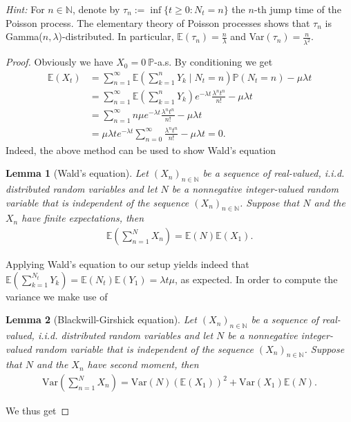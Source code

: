 \documentclass[12pt,a4paper, twoside]{article}
\newtheorem{lem}{Lemma}[section]
\theoremstyle{definition}
\newcommand{\EE}{\mathbb{E}} %
\newcommand{\PP}{\mathbb{P}} %
\begin{document}
\textit{Hint:} For $n \in \mathbb{N}$, denote by $\tau_n := \inf \{ t \geq 0 : N_t = n \}$ the $n$-th jump time of the Poisson process. The elementary theory of Poisson processes shows that $\tau_n$ is Gamma($n,  \lambda$)-distributed. In particular,  $\EE( \tau_n) = \frac{n}{\lambda}$ and Var$( \tau_n) = \frac{n}{\lambda^2}$. 
\begin{proof}
Obviously we have $X_0=0 \ \PP$-a.s. By conditioning we get
\begin{align*}
\EE (X_t)& = \sum_{n=1}^\infty \EE\left( \sum_{k=1}^n Y_k  \mid N_t = n \right) \PP(N_t=n)- \mu \lambda t \\
&= \sum_{n=1}^\infty \EE \left( \sum_{k=1}^n Y_k \right) e^{- \lambda t} \frac{\lambda^n t^n}{n!}- \mu \lambda t \tag{$N_t \sim P_o( \lambda) \perp Y_k$} \\
& =\sum_{n=1}^\infty n \mu e^{- \lambda t} \frac{\lambda^n t^n}{n!}- \mu \lambda t \\ & = \mu \lambda t e^{- \lambda t} \sum_{n=0}^\infty  \frac{\lambda^n t^n}{n!}- \mu  \lambda t =0.
\end{align*}
Indeed, the above method can be used to show Wald's equation
\begin{lem}[Wald's equation] Let $(X_n)_{n \in \mathbb{N}}$ be a sequence of real-valued, i.i.d. distributed random variables and let $N$ be a nonnegative integer-valued random variable that is independent of the sequence $(X_n)_{n \in \mathbb{N}}$. Suppose that $N$ and the $X_n$ have finite expectations, then
\begin{align*}
\EE \left( \sum_{n=1}^N X_n \right) = \EE(N)\EE(X_1).
\end{align*}
\end{lem}
Applying Wald's equation to our setup yields indeed that \\ $\EE( \sum_{k=1}^{N_t} Y_k) = \EE( N_t) \EE(Y_1) = \lambda t \mu$, as expected. 
\newpage
In order to compute the variance we make use of 
\begin{lem}[Blackwill-Girshick equation]Let $(X_n)_{n \in \mathbb{N}}$ be a sequence of real-valued, i.i.d. distributed random variables and let $N$ be a nonnegative integer-valued random variable that is independent of the sequence $(X_n)_{n \in \mathbb{N}}$. Suppose that $N$ and the $X_n$ have second moment, then
\begin{align*}
\text{Var} \left( \sum_{n=1}^N X_n\right) = \text{Var}(N)(\EE(X_1))^2+ \text{Var}(X_1)\EE(N).
\end{align*}
\end{lem}
We thus get 

\end{proof}
\end{document}

